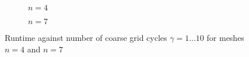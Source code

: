 \documentclass[11pt,a4paper]{article}
\begin{document}
\begin{figure}[h!]
	\centering
	\begin{subfigure}[h!]{.49\textwidth}
		\begin{center}
			\resizebox{0.52\width}{!}{}
			\caption{$n=4$}
			\label{fig::TimGamma1}
		\end{center}	
	\end{subfigure}
	\hfill
	\begin{subfigure}[h!]{.49\textwidth}
		\centering
		\resizebox{0.52\width}{!}{}
		\caption{$n=7$}
		\label{fig::TimGamma2}
	\end{subfigure}
	\caption{Runtime against number of coarse grid cycles $\gamma = 1...10 $ for meshes $n=4$ and $n=7$ }
	\label{fig::TimGamma}
\end{figure}
%
\end{document}
